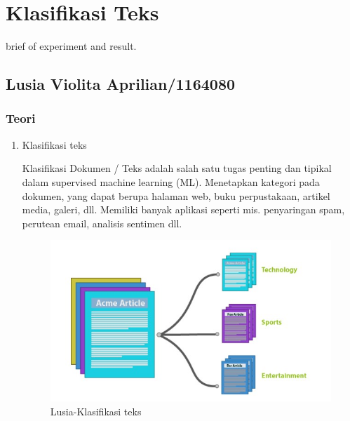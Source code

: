 \chapter{Klasifikasi Teks}
brief of experiment and result.

\section{Lusia Violita Aprilian/1164080}

\subsection{Teori}
\begin{enumerate}
\item Klasifikasi teks
	\par Klasifikasi Dokumen / Teks adalah salah satu tugas penting dan tipikal dalam supervised machine learning (ML). Menetapkan kategori pada dokumen, yang dapat berupa halaman web, buku perpustakaan, artikel media, galeri, dll. Memiliki banyak aplikasi seperti mis. penyaringan spam, perutean email, analisis sentimen dll. 
	\begin{figure}[ht]
		\centering
		\includegraphics[scale=0.5]{figures/m1.jpg}
		\caption{Lusia-Klasifikasi teks}
		\label{contoh}
	\end{figure}
	

\end{enumerate}

